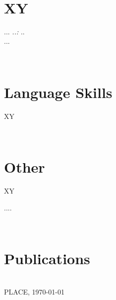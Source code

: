\documentclass[11pt,a4paper,sans]{moderncv}
\begin{document}
~\\[2em]
\section{XY}
   {...}{}{}{
    \textit{..:} .. \\
    ...
  }


~\\[2em]
\section{Language Skills}
     {XY}{}

~\\[2em]
\section{Other}
     {XY}

....

~\\[2em]
\section{Publications}
\nocite{*}
\printbibliography[heading=none]

\emptysection \closesection
~\\[0em] PLACE, \today

\clearpage

\end{document}
